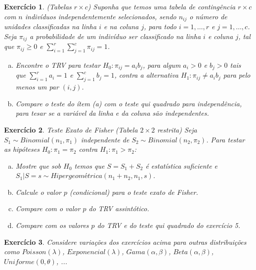 \documentclass[letter,11pt]{article}
\newtheorem{exer}{Exercício}
\begin{document}
\begin{exer} \rm
\textit{(Tabelas $r \times c$)} Suponha que temos uma tabela de contingência $r \times c$ com $n$ indivíduos independentemente selecionados, sendo $n_{ij}$ o número de unidades classificadas na linha $i$ e na coluna $j$, para todo $i=1, \ldots, r$ e $j=1, \ldots, c$. Seja $\pi_{ij}$ a probabilidade de um indivíduo ser classificado na linha $i$ e coluna $j$, tal que $\pi_{ij} \geq 0$ e $\sum_{i=1}^{r} \sum_{j=1}^{c} \pi_{ij} = 1$.
\begin{enumerate}[a)]
  \item Encontre o TRV para testar $H_0: \pi_{ij} = a_i b_j$, para algum $a_i > 0$ e $b_j>0$ tais que $\sum_{i=1}^r a_i = 1$ e $\sum_{j=1}^c b_j = 1$, contra a alternativa $H_1: \pi_{ij} \neq a_i b_j$ para pelo menos um par $(i,j)$. 
  \item Compare o teste do ítem (a) com o teste qui quadrado para independência, para tesar se a variável da linha e da coluna são independentes.
\end{enumerate}
\end{exer}


\begin{exer} \rm
\textit{Teste Exato de Fisher}
\textit{(Tabela $2 \times 2$ restrita)} Seja $S_1 \sim Binomial(n_1, \pi_1)$ independente de $S_2 \sim Binomial(n_2, \pi_2)$. Para testar as hipóteses $H_0: \pi_1 = \pi_2$ contra $H_1: \pi_1 > \pi_2$:
\begin{enumerate}[a)]
  \item Mostre que sob $H_0$ temos que $S = S_1 + S_2$ é estatística suficiente e $S_1 \vert S = s \sim \textit{Hipergeométrica}(n_1+n_2, n_1, s)$.
  \item Calcule o valor $p$ (condicional) para o teste exato de Fisher.  
  \item Compare com o valor $p$ do TRV assintótico.
  \item Compare com os valores $p$ do TRV e do teste qui quadrado do exercício 5.
\end{enumerate}
\end{exer}



\begin{exer} \rm
Considere variações dos exercícios acima para outras distribuições como $Poisson(\lambda)$, $Exponencial(\lambda)$, $Gama(\alpha, \beta)$, $Beta(\alpha, \beta)$, $Uniforme(0, \theta)$, ...
\end{exer}
\end{document}

